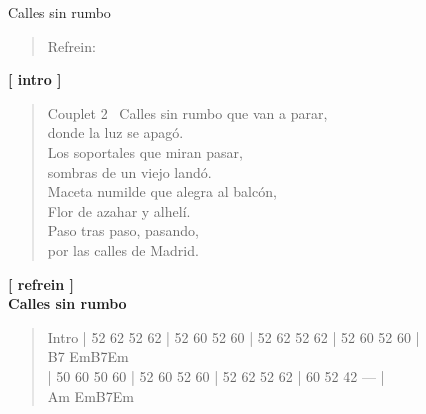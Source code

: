\begin{song}{Calles sin rumbo}
\begin{verse}{Refrein:}
		\end{verse}
		\textbf{[  intro  ]}	
		\begin{verse}{Couplet 2}
			\ Calles sin rumbo que van a parar,\\
			donde la luz se apagó.\\
			Los soportales que miran pasar,\\
			sombras de un viejo landó.\\	
			Maceta numilde que alegra al balcón,\\
			Flor de azahar y alhelí.\\
			Paso tras paso, pasando,\\
			por las calles de Madrid.\\
		\end{verse}
		\textbf{[  refrein  ]} \\ 
			\textbf{Calles sin rumbo} \\ 
		\begin{verse}{Intro}
			| 52 62 52 62 | 52 60 52 60 | 52 62 52 62 | 52 60 52 60 |\\ 
			\hspace*{0.5em}B7 \hspace{4.6em}Em\hspace{4.6em}B7\hspace{4.9em}Em\\
			| 50 60 50 60 | 52 60 52 60 | 52 62 52 62 | 60 52 42 --- |\\ 
			\hspace*{0.5em}Am \hspace{4.4em}Em\hspace{4.6em}B7\hspace{4.8em}Em\\
		\end{verse}
	\end{song}
